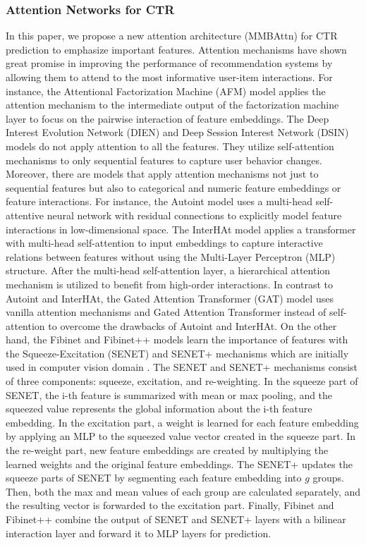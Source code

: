 \documentclass{article}
\begin{document}
\subsubsection{Attention Networks for CTR}
In this paper, we propose a new attention architecture (MMBAttn) for CTR prediction to emphasize important features. Attention mechanisms have shown great promise in improving the performance of recommendation systems by allowing them to attend to the most informative user-item interactions. For instance, the Attentional Factorization Machine (AFM) model \cite{xiao2017attentional} applies the attention mechanism to the intermediate output of the factorization machine layer to focus on the pairwise interaction of feature embeddings. The Deep Interest Evolution Network (DIEN) and Deep Session Interest Network (DSIN) models \cite{zhou2019deep, feng2019deep} do not apply attention to all the features. They utilize self-attention mechanisms to only sequential features to capture user behavior changes. Moreover, there are models that apply attention mechanisms not just to sequential features but also to categorical and numeric feature embeddings or feature interactions. For instance, the Autoint model \cite{song2019autoint} uses a multi-head self-attentive neural network with residual connections to explicitly model feature interactions in low-dimensional space. The InterHAt model \cite{li2020interpretable} applies a transformer with multi-head self-attention to input embeddings to capture interactive relations between features without using the Multi-Layer Perceptron (MLP) structure. After the multi-head self-attention layer, a hierarchical attention mechanism is utilized to benefit from high-order interactions. In contrast to Autoint and InterHAt, the Gated Attention Transformer (GAT) model \cite{long2021efficient} uses vanilla attention mechanisms and Gated Attention Transformer instead of self-attention to overcome the drawbacks of Autoint and InterHAt.
On the other hand, the Fibinet and Fibinet++ models \cite{huang2019fibinet, zhang2022fibinet++} learn the importance of features with the Squeeze-Excitation (SENET) and SENET+ mechanisms which are initially used in computer vision domain \cite{wang2020eca}. The SENET and SENET+ mechanisms consist of three components: squeeze, excitation, and re-weighting. In the squeeze part of SENET, the i-th feature is summarized with mean or max pooling, and the squeezed value represents the global information about the i-th feature embedding. In the excitation part, a weight is learned for each feature embedding by applying an MLP to the squeezed value vector created in the squeeze part. In the re-weight part, new feature embeddings are created by multiplying the learned weights and the original feature embeddings. The SENET+ updates the squeeze parts of SENET by segmenting each feature embedding into $g$ groups. Then, both the max and mean values of each group are calculated separately, and the resulting vector is forwarded to the excitation part. Finally, Fibinet and Fibinet++ combine the output of SENET and SENET+ layers with a bilinear interaction layer and forward it to MLP layers for prediction.
\end{document}
